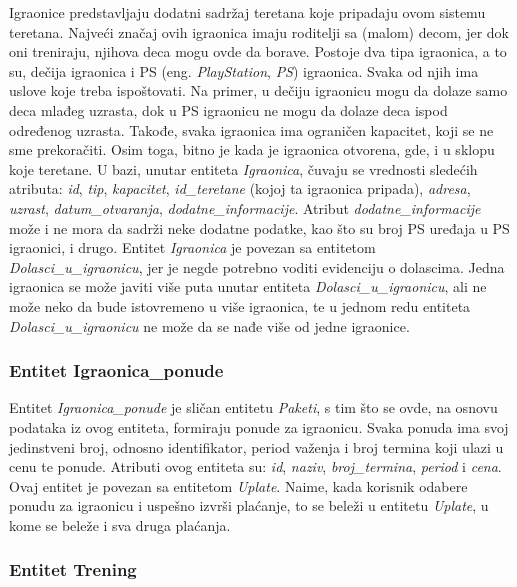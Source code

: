 \documentclass[../main.tex]{subfiles}
\begin{document}
Igraonice predstavljaju dodatni sadržaj teretana koje pripadaju ovom sistemu teretana. Najveći značaj ovih igraonica imaju roditelji sa (malom) decom, jer dok oni treniraju, njihova deca mogu ovde da borave. Postoje dva tipa igraonica, a to su, dečija igraonica i PS (eng. \textit{PlayStation}, \textit{PS}) igraonica. Svaka od njih ima uslove koje treba ispoštovati. Na primer, u dečiju igraonicu mogu da dolaze samo deca mlađeg uzrasta, dok u PS igraonicu ne mogu da dolaze deca ispod određenog uzrasta. Takođe, svaka igraonica ima ograničen kapacitet, koji se ne sme prekoračiti. Osim toga, bitno je kada je igraonica otvorena, gde, i u sklopu koje teretane.
U bazi, unutar entiteta \textit{Igraonica}, čuvaju se vrednosti sledećih atributa: \textit{id}, \textit{tip},  \textit{kapacitet},  \textit{id\_teretane} (kojoj ta igraonica pripada),  \textit{adresa}, \textit{uzrast}, \textit{datum\_otvaranja}, \textit{dodatne\_informacije}. Atribut \textit{dodatne\_informacije} može i ne mora da sadrži neke dodatne podatke, kao što su broj PS uređaja u PS igraonici, i drugo. Entitet  \textit{Igraonica} je povezan sa entitetom \textit{Dolasci\_u\_igraonicu}, jer je negde potrebno voditi evidenciju o dolascima. Jedna igraonica se može javiti više puta unutar entiteta \textit{Dolasci\_u\_igraonicu}, ali ne može neko da bude istovremeno u više igraonica, te u jednom redu entiteta \textit{Dolasci\_u\_igraonicu} ne može da se nađe više od jedne igraonice.


\subsubsection{Entitet Igraonica\_ponude}

Entitet  \textit{Igraonica\_ponude} je sličan entitetu  \textit{Paketi}, s tim što se ovde, na osnovu podataka iz ovog entiteta, formiraju ponude za igraonicu. Svaka ponuda ima svoj jedinstveni broj, odnosno identifikator, period važenja i broj termina koji ulazi u cenu te ponude. Atributi ovog entiteta su:  \textit{id},  \textit{naziv},  \textit{broj\_termina},  \textit{period} i  \textit{cena}. Ovaj entitet je povezan sa entitetom  \textit{Uplate}. Naime, kada korisnik odabere ponudu za igraonicu i uspešno izvrši plaćanje, to se beleži u entitetu  \textit{Uplate}, u kome se beleže i sva druga plaćanja.


\subsubsection{Entitet Trening}
\end{document}
